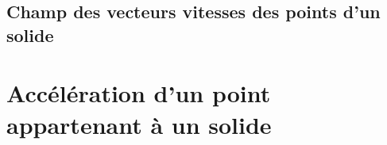 \documentclass[10pt,oneside]{article}
\begin{document}
\subsection{Champ des vecteurs vitesses des points d'un solide}




\section{Accélération d'un point appartenant à un solide}


\begin{thebibliography}{2}
\end{thebibliography}
\end{document}
